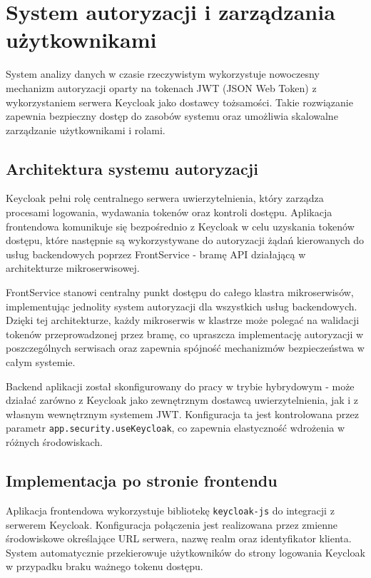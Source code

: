 \section{System autoryzacji i zarządzania użytkownikami}
\label{chap:autoryzacja}

System analizy danych w czasie rzeczywistym wykorzystuje nowoczesny mechanizm autoryzacji oparty na tokenach JWT (JSON Web Token) z wykorzystaniem serwera Keycloak jako dostawcy tożsamości. Takie rozwiązanie zapewnia bezpieczny dostęp do zasobów systemu oraz umożliwia skalowalne zarządzanie użytkownikami i rolami.

\subsection{Architektura systemu autoryzacji}

Keycloak pełni rolę centralnego serwera uwierzytelnienia, który zarządza procesami logowania, wydawania tokenów oraz kontroli dostępu. Aplikacja frontendowa komunikuje się bezpośrednio z Keycloak w celu uzyskania tokenów dostępu, które następnie są wykorzystywane do autoryzacji żądań kierowanych do usług backendowych poprzez FrontService - bramę API działającą w architekturze mikroserwisowej.

FrontService stanowi centralny punkt dostępu do całego klastra mikroserwisów, implementując jednolity system autoryzacji dla wszystkich usług backendowych. Dzięki tej architekturze, każdy mikroserwis w klastrze może polegać na walidacji tokenów przeprowadzonej przez bramę, co upraszcza implementację autoryzacji w poszczególnych serwisach oraz zapewnia spójność mechanizmów bezpieczeństwa w całym systemie.

Backend aplikacji został skonfigurowany do pracy w trybie hybrydowym - może działać zarówno z Keycloak jako zewnętrznym dostawcą uwierzytelnienia, jak i z własnym wewnętrznym systemem JWT. Konfiguracja ta jest kontrolowana przez parametr \texttt{app.security.useKeycloak}, co zapewnia elastyczność wdrożenia w różnych środowiskach.

\subsection{Implementacja po stronie frontendu}

Aplikacja frontendowa wykorzystuje bibliotekę \texttt{keycloak-js} do integracji z serwerem Keycloak. Konfiguracja połączenia jest realizowana przez zmienne środowiskowe określające URL serwera, nazwę realm oraz identyfikator klienta. System automatycznie przekierowuje użytkowników do strony logowania Keycloak w przypadku braku ważnego tokenu dostępu.

